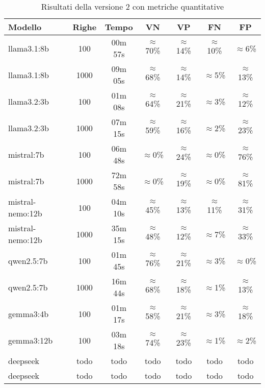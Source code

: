\documentclass[12pt]{report}
\begin{document}
\begin{table}[h!]
    \centering
    \begin{tabular}{|l|c|c|c|c|c|c|}
        \hline
        \textbf{Modello} & \textbf{Righe} & \textbf{Tempo} & \textbf{VN} & \textbf{VP} & \textbf{FN} & \textbf{FP} \\ \hline
        llama3.1:8b & 100 & 00m 57s & $\approx$70\% & $\approx$14\% & $\approx$10\% & $\approx$6\% \\ \hline
        llama3.1:8b & 1000 & 09m 05s & $\approx$68\% & $\approx$14\% & $\approx$5\% & $\approx$13\% \\ \hline
        llama3.2:3b & 100 & 01m 08s & $\approx$64\% & $\approx$21\% & $\approx$3\% & $\approx$12\% \\ \hline
        llama3.2:3b & 1000 & 07m 15s & $\approx$59\% & $\approx$16\% & $\approx$2\% & $\approx$23\% \\ \hline
        mistral:7b & 100 & 06m 48s & $\approx$0\% & $\approx$24\% & $\approx$0\% & $\approx$76\% \\ \hline
        mistral:7b & 1000 & 72m 58s & $\approx$0\% & $\approx$19\% & $\approx$0\% & $\approx$81\% \\ \hline
        mistral-nemo:12b & 100 & 04m 10s & $\approx$45\% & $\approx$13\% & $\approx$11\% & $\approx$31\% \\ \hline
        mistral-nemo:12b & 1000 & 35m 15s & $\approx$48\% & $\approx$12\% & $\approx$7\% & $\approx$33\% \\ \hline
        qwen2.5:7b & 100 & 01m 45s & $\approx$76\% & $\approx$21\% & $\approx$3\% & $\approx$0\% \\ \hline
        qwen2.5:7b & 1000 & 16m 44s & $\approx$68\% & $\approx$18\% & $\approx$1\% & $\approx$13\% \\ \hline
        gemma3:4b & 100 & 01m 17s & $\approx$58\% & $\approx$21\% & $\approx$3\% & $\approx$18\% \\ \hline
        gemma3:12b & 100 & 03m 18s & $\approx$74\% & $\approx$23\% & $\approx$1\% & $\approx$2\% \\ \hline
        deepseek & todo & todo & todo & todo & todo & todo \\ \hline
        deepseek & todo & todo & todo & todo & todo & todo \\ \hline
    \end{tabular}
    \caption{Risultati della versione 2 con metriche quantitative}
    \label{tab:risultati_v2}
\end{table}

\end{document}
